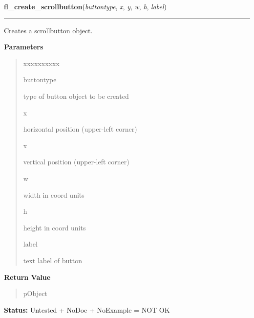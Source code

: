     \label{xformslib:library:fl_create_scrollbutton}

    \vspace{0.5ex}

\hspace{.8\funcindent}\begin{boxedminipage}{\funcwidth}

    \raggedright \textbf{fl\_create\_scrollbutton}(\textit{buttontype}, \textit{x}, \textit{y}, \textit{w}, \textit{h}, \textit{label})

    \vspace{-1.5ex}

    \rule{\textwidth}{0.5\fboxrule}
\setlength{\parskip}{2ex}
    Creates a scrollbutton object.

\setlength{\parskip}{1ex}
      \textbf{Parameters}
      \vspace{-1ex}

      \begin{quote}
        \begin{Ventry}{xxxxxxxxxx}

          \item[buttontype]

          type of button object to be created

          \item[x]

          horizontal position (upper-left corner)

          \item[x]

          vertical position (upper-left corner)

          \item[w]

          width in coord units

          \item[h]

          height in coord units

          \item[label]

          text label of button

        \end{Ventry}

      \end{quote}

      \textbf{Return Value}
    \vspace{-1ex}

      \begin{quote}
      pObject

      \end{quote}

\textbf{Status:} Untested + NoDoc + NoExample = NOT OK



    \end{boxedminipage}

